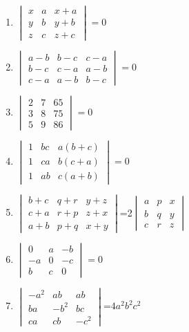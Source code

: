 \begin{enumerate}[label=\arabic*.,ref=\thesubsection.\theenumi]
\item $\begin{vmatrix}
x&a&x+a\\y&b&y+b\\z&c&z+c\end{vmatrix}=0$
\\
\solution 

\item $\begin{vmatrix}
a-b&b-c&c-a\\b-c&c-a&a-b\\c-a&a-b&b-c\end{vmatrix}=0$
\\
\solution 

\item $\begin{vmatrix}2&7&65\\3&8&75\\5&9&86\end{vmatrix}=0$
\\
\solution 

\item $\begin{vmatrix}1&bc&a(b+c)\\1&ca&b(c+a)\\1&ab&c(a+b)\end{vmatrix}=0$
\\
\solution 

\item $\begin{vmatrix}b+c& q+r& y+z\\c+a& r+p& z+x\\a+b& p+q& x+y\end{vmatrix}$=2$\begin{vmatrix} a&p&x\\b&q&y\\c&r&z\end{vmatrix}$ 
\item $\begin{vmatrix}0&a&-b\\-a&0&-c\\b&c&0\end{vmatrix}=0$
\\
\solution 

\item $\begin{vmatrix}-a^2&ab&ab\\ ba&-b^2&bc\\ ca&cb&-c^2\end{vmatrix}$=$4a^2b^2c^2$\\

\end{enumerate}

